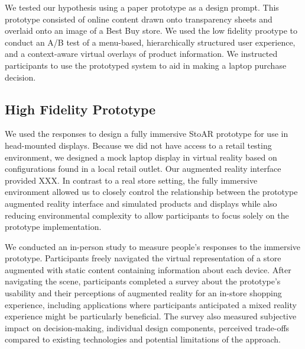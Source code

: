 We tested our hypothesis using a paper prototype as a design prompt. This prototype consisted of online content drawn onto transparency sheets and overlaid onto an image of a Best Buy store. We used the low fidelity prootype to conduct an A/B test of a menu-based, hierarchically structured user experience, and a context-aware virtual overlays of product information.   We instructed participants to use the prototyped system to aid in making a laptop purchase decision. 

\subsection{High Fidelity Prototype}
We used the responses to design a fully immersive StoAR prototype for use in head-mounted displays. Because we did not have access to a retail testing environment, we designed a mock laptop display in virtual reality based on configurations found in a local retail outlet. Our augmented reality interface provided XXX. In contrast to a real store setting, the fully immersive environment allowed us to closely control the relationship between the prototype augmented reality interface and simulated products and displays while also reducing environmental complexity to allow participants to focus solely on the prototype implementation. 

We conducted an in-person study to measure people's responses to the immersive prototype. Participants freely navigated the virtual representation of a store augmented with static content containing information about each device. 
After navigating the scene, participants completed a survey about the prototype's usability and their perceptions of augmented reality for an in-store shopping experience, including applications where participants anticipated a mixed reality experience might be particularly beneficial.  
The survey also measured subjective impact on decision-making, individual design components, perceived trade-offs compared to existing technologies and potential limitations of the approach.
